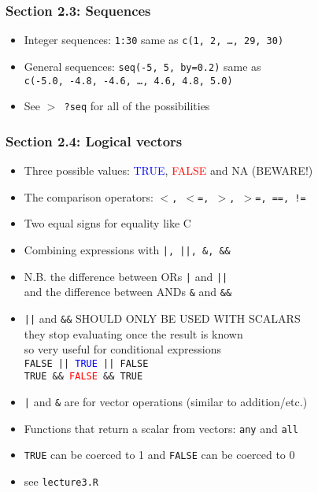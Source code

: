 \documentclass[11pt,pdftex,dvipsnames,usenames,helvetica]{beamer}
\newcommand*{\red}[1]{\textcolor{red}{#1}}
\newcommand*{\blue}[1]{\textcolor{blue}{#1}}
\begin{document}
\begin{frame} 
\frametitle{Section 2.3: Sequences}

\begin{itemize}
\item Integer sequences: {\tt 1:30} same as {\tt c(1, 2, \dots, 29, 30)}
\item General sequences: {\tt seq(-5, 5, by=0.2)} same as \\
{\tt c(-5.0, -4.8, -4.6, \dots, 4.6, 4.8, 5.0)}
\item See {\tt $>$ ?seq} for all of the possibilities
\end{itemize} 

\end{frame}

\begin{frame}
\frametitle{Section 2.4: Logical vectors}

\begin{itemize}
\item Three possible values: \blue{TRUE}, \red{FALSE} and NA (BEWARE!)
\item The comparison operators: {\tt $<$, $<$=, $>$, $>$=, ==, !=}
\item Two equal signs for equality like C
\item Combining expressions with {\tt |, ||, \&, \&\&}
\item N.B. the difference between ORs {\tt |} and {\tt ||}\\
and the difference between ANDs {\tt \&} and {\tt \&\&}
\item {\tt ||} and {\tt \&\&} SHOULD ONLY BE USED WITH SCALARS\\
they stop evaluating once the result is known\\
so very useful for conditional expressions\\
{\tt FALSE || \textcolor{blue}{TRUE} || FALSE}\\
{\tt TRUE \&\& \textcolor{red}{FALSE} \&\& TRUE}\\
\item {\tt |} and {\tt \&} are for vector operations 
(similar to addition/etc.)
\item Functions that return a scalar from vectors: {\tt any} and {\tt all}
\item {\tt TRUE} can be coerced to 1 and {\tt FALSE} can be coerced to 0\\
\item see {\tt lecture3.R}
\end{itemize}

\end{frame}
\end{document}
